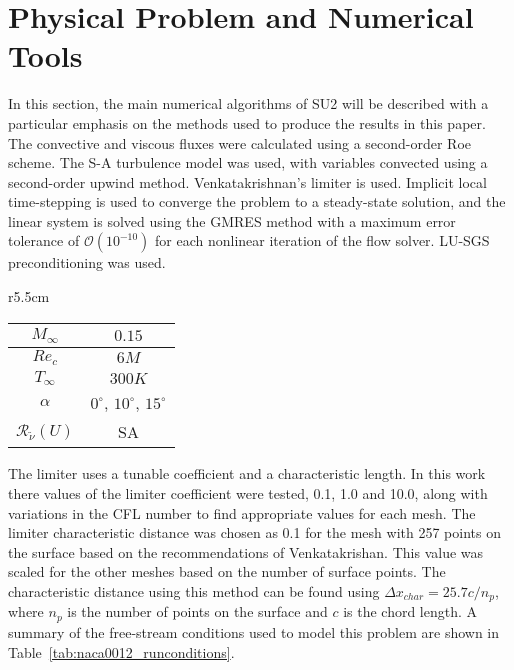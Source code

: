 
\section{Physical Problem and Numerical Tools}

In this section, the main numerical algorithms of SU2 will be described with a particular emphasis on the methods used to produce the results in this paper. The convective and viscous fluxes were calculated using a second-order Roe scheme. The S-A turbulence model was used, with variables convected using a second-order upwind method. Venkatakrishnan's limiter is used. Implicit local time-stepping is used to converge the problem to a steady-state solution, and the linear system is solved using the GMRES method with a maximum error tolerance of $\mathcal{O}(10^{-10})$ for each nonlinear iteration of the flow solver. LU-SGS preconditioning was used.

\begin{wraptable}{r}{5.5cm}
  \begin{center}
  \begin{tabular}{||c|c||} \hline
    $M_\infty$ & $0.15$ \\ \hline 
    $Re_c$     & $6M$ \\ \hline
    $T_\infty$ & $300K$ \\ \hline
    $\alpha$ & $0^{\circ}$, $10^{\circ}$, $15^{\circ}$ \\ \hline
    $\mathcal{R}_{\tilde\nu}(U)$ & SA \\ \hline
  \end{tabular}
  \caption{NACA 0012 free-stream conditions.} \label{tab:naca0012_runconditions}
  \end{center}
\end{wraptable} 

The limiter uses a tunable coefficient and a characteristic length. In this work there values of the limiter coefficient were tested, 0.1, 1.0 and 10.0, along with variations in the CFL number to find appropriate values for each mesh. The limiter characteristic distance was chosen as 0.1 for the mesh with 257 points on the surface based on the recommendations of Venkatakrishan\cite{Venkatakrishnan:1993}. This value was scaled for the other meshes based on the number of surface points. The characteristic distance using this method can be found using $\Delta x_{char} = 25.7 c  / n_p $, where $n_p$ is the number of points on the surface and $c$ is the chord length.
A summary of the free-stream conditions used to model this problem are shown in Table~\ref{tab:naca0012_runconditions}. 






%






